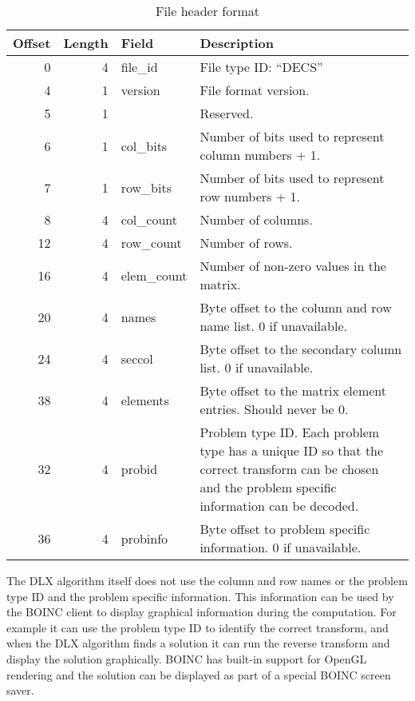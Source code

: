 \begin{table}[htbp]
	\centering
	\begin{tabular}{|r|r|l|p{2.7in}|}
		\hline
		\bf Offset & \bf Length & \bf Field & \bf Description \\ \hline
		0  & 4 & file\_id & File type ID: ``DECS'' \\ \hline
		4  & 1 & version & File format version. \\ \hline
		5  & 1 & & Reserved. \\ \hline
		6  & 1 & col\_bits & Number of bits used to represent column numbers + 1. \\ \hline
		7  & 1 & row\_bits & Number of bits used to represent row numbers + 1. \\ \hline
		8  & 4 & col\_count & Number of columns. \\ \hline
		12 & 4 & row\_count & Number of rows. \\ \hline
		16 & 4 & elem\_count & Number of non-zero values in the matrix. \\ \hline
		20 & 4 & names & Byte offset to the column and row name list. 0 if unavailable. \\ \hline
		24 & 4 & seccol & Byte offset to the secondary column list. 0 if unavailable. \\ \hline
		38 & 4 & elements & Byte offset to the matrix element entries. Should never be 0. \\ \hline
		32 & 4 & probid & Problem type ID. Each problem type has a unique ID so that the correct transform can be chosen and the problem specific information can be decoded. \\ \hline
		36 & 4 & probinfo & Byte offset to problem specific information. 0 if unavailable. \\ \hline
	\end{tabular}
	\caption{File header format}
	\label{tab:header}
\end{table}

The DLX algorithm itself does not use the column and row names or the problem type ID and the problem specific information.
This information can be used by the BOINC client to display graphical information during the computation.
For example it can use the problem type ID to identify the correct transform, and when the DLX algorithm finds a solution it can run the reverse transform and display the solution graphically.
BOINC has built-in support for OpenGL rendering and the solution can be displayed as part of a special BOINC screen saver.

